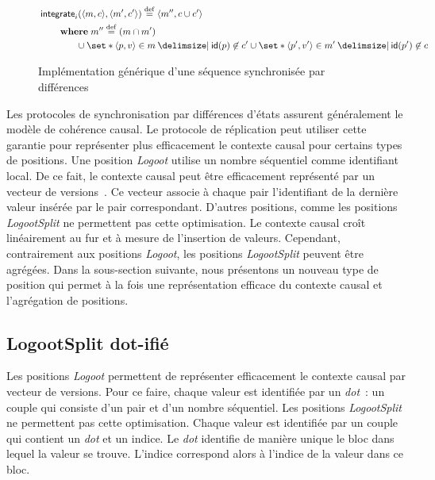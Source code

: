 \begin{figure}[htb]
\begin{align}
    &\begin{aligned}
    \MoveEqLeft \trm{integrate}_i(\tuple*{m,c}, \tuple*{m',c'}) \defeq \tuple*{m'',c \cup c'}\\
        &\begin{aligned}
        \MoveEqLeft\where m'' \defeq (m \cap m')\\
        & \cup \set*{\tuple*{p, v} \in m\given \trm{id}(p) \not\in c'} \cup \set*{\tuple*{p', v'} \in m' \given \trm{id}(p') \not\in c}
        \end{aligned}
    \end{aligned}\label{eq:deltaseq-integr}
    \end{align}
    \caption{Implémentation générique d'une séquence synchronisée par différences}\label{fig:deltaseq}
\end{figure}

Les protocoles de synchronisation par différences d'états assurent généralement le modèle de cohérence causal.
Le protocole de réplication peut utiliser cette garantie pour représenter plus efficacement le contexte causal pour certains types de positions.
Une position \emph{Logoot} utilise un nombre séquentiel comme identifiant local.
De ce fait, le contexte causal peut être efficacement représenté par un vecteur de versions~\autocite{parker_1983_versionvector,mattern_1988_timevector}.
Ce vecteur associe à chaque pair l'identifiant de la dernière valeur insérée par le pair correspondant.
D'autres positions, comme les positions \emph{LogootSplit} ne permettent pas cette optimisation.
Le contexte causal croît linéairement au fur et à mesure de l'insertion de valeurs.
Cependant, contrairement aux positions \emph{Logoot}, les positions \emph{LogootSplit} peuvent être agrégées.
Dans la sous-section suivante, nous présentons un nouveau type de position qui permet à la fois une représentation efficace du contexte causal et l'agrégation de positions.


\subsection{LogootSplit dot-ifié}\label{subsec:dotted-logootsplit}

Les positions \emph{Logoot} permettent de représenter efficacement le contexte causal par vecteur de versions.
Pour ce faire, chaque valeur est identifiée par un \emph{dot}~: un couple qui consiste d'un pair et d'un nombre séquentiel.
Les positions \emph{LogootSplit} ne permettent pas cette optimisation.
Chaque valeur est identifiée par un couple qui contient un \emph{dot} et un indice.
Le \emph{dot} identifie de manière unique le bloc dans lequel la valeur se trouve.
L'indice correspond alors à l'indice de la valeur dans ce bloc.

